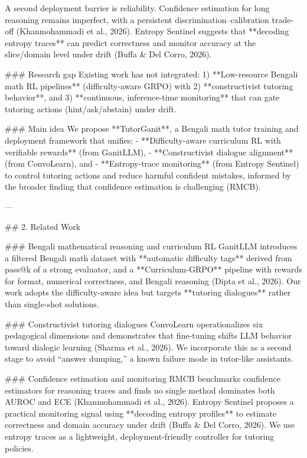 A second deployment barrier is reliability. Confidence estimation for long reasoning remains imperfect, with a persistent discrimination–calibration trade-off (Khanmohammadi et al., 2026). Entropy Sentinel suggests that **decoding entropy traces** can predict correctness and monitor accuracy at the slice/domain level under drift (Buffa & Del Corro, 2026).  

### Research gap  
Existing work has not integrated:  
1) **Low-resource Bengali math RL pipelines** (difficulty-aware GRPO) with  
2) **constructivist tutoring behavior**, and  
3) **continuous, inference-time monitoring** that can gate tutoring actions (hint/ask/abstain) under drift.  

### Main idea  
We propose **TutorGanit**, a Bengali math tutor training and deployment framework that unifies:  
- **Difficulty-aware curriculum RL with verifiable rewards** (from GanitLLM),  
- **Constructivist dialogue alignment** (from ConvoLearn), and  
- **Entropy-trace monitoring** (from Entropy Sentinel) to control tutoring actions and reduce harmful confident mistakes, informed by the broader finding that confidence estimation is challenging (RMCB).

---

## 2. Related Work  

### Bengali mathematical reasoning and curriculum RL  
GanitLLM introduces a filtered Bengali math dataset with **automatic difficulty tags** derived from pass@k of a strong evaluator, and a **Curriculum-GRPO** pipeline with rewards for format, numerical correctness, and Bengali reasoning (Dipta et al., 2026). Our work adopts the difficulty-aware idea but targets **tutoring dialogues** rather than single-shot solutions.

### Constructivist tutoring dialogues  
ConvoLearn operationalizes six pedagogical dimensions and demonstrates that fine-tuning shifts LLM behavior toward dialogic learning (Sharma et al., 2026). We incorporate this as a second stage to avoid “answer dumping,” a known failure mode in tutor-like assistants.

### Confidence estimation and monitoring  
RMCB benchmarks confidence estimators for reasoning traces and finds no single method dominates both AUROC and ECE (Khanmohammadi et al., 2026). Entropy Sentinel proposes a practical monitoring signal using **decoding entropy profiles** to estimate correctness and domain accuracy under drift (Buffa & Del Corro, 2026). We use entropy traces as a lightweight, deployment-friendly controller for tutoring policies.

